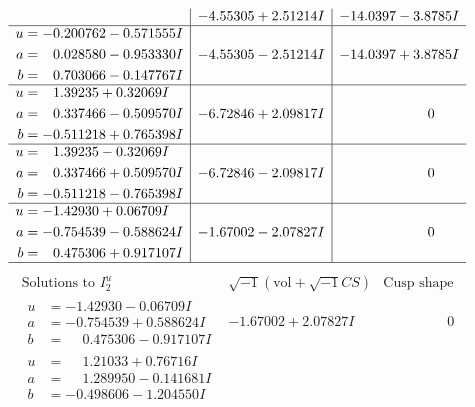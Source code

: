 \documentclass[1p]{elsarticle_modified}
\theoremstyle{definition}
\newcommand{\I}{\sqrt{-1}}
\begin{document}
$$\begin{array}{c|c|c}
 & -4.55305 + 2.51214 I & -14.0397 - 3.8785 I \\ \hline\begin{aligned}
u &= -0.200762 - 0.571555 I \\
a &= \phantom{-}0.028580 - 0.953330 I \\
b &= \phantom{-}0.703066 - 0.147767 I\end{aligned}
 & -4.55305 - 2.51214 I & -14.0397 + 3.8785 I \\ \hline\begin{aligned}
u &= \phantom{-}1.39235 + 0.32069 I \\
a &= \phantom{-}0.337466 - 0.509570 I \\
b &= -0.511218 + 0.765398 I\end{aligned}
 & -6.72846 + 2.09817 I & \phantom{-0.000000 } 0 \\ \hline\begin{aligned}
u &= \phantom{-}1.39235 - 0.32069 I \\
a &= \phantom{-}0.337466 + 0.509570 I \\
b &= -0.511218 - 0.765398 I\end{aligned}
 & -6.72846 - 2.09817 I & \phantom{-0.000000 } 0 \\ \hline\begin{aligned}
u &= -1.42930 + 0.06709 I \\
a &= -0.754539 - 0.588624 I \\
b &= \phantom{-}0.475306 + 0.917107 I\end{aligned}
 & -1.67002 - 2.07827 I & \phantom{-0.000000 } 0\\
 \hline 
 \end{array}$$\newpage$$\begin{array}{c|c|c}  
\text{Solutions to }I^u_{2}& \I (\text{vol} + \sqrt{-1}CS) & \text{Cusp shape}\\
 \hline 
\begin{aligned}
u &= -1.42930 - 0.06709 I \\
a &= -0.754539 + 0.588624 I \\
b &= \phantom{-}0.475306 - 0.917107 I\end{aligned}
 & -1.67002 + 2.07827 I & \phantom{-0.000000 } 0 \\ \hline\begin{aligned}
u &= \phantom{-}1.21033 + 0.76716 I \\
a &= \phantom{-}1.289950 - 0.141681 I \\
b &= -0.498606 - 1.204550 I\end{aligned}

\end{array}$$
\end{document}
